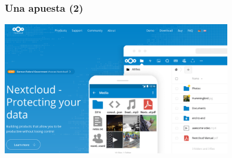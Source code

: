 \documentclass[17pt,aspectratio=169,hyperref=pdfusetitle]{beamer}
\begin{document}
\begin{frame}[fragile]
  \frametitle{Una apuesta (2)}

  \begin{center}
  \includegraphics[width=10cm]{figs/nextcloud}
  \end{center}
  
\end{frame}





  



  


\end{document}
